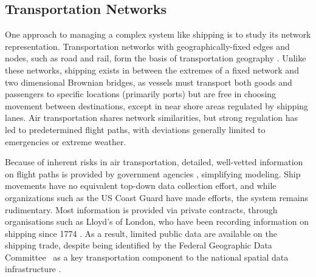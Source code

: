 



\subsection{Transportation Networks}
One approach to managing a complex system like shipping is to study its network representation.  Transportation networks with geographically-fixed edges and nodes, such as road and rail, form the basis of transportation geography \citep{Rodrigue2009}. Unlike these networks, shipping exists in between the extremes of a fixed network %
 and two dimensional Brownian bridges, as vessels must transport both goods and passengers to specific locations (primarily ports) but are free in choosing movement between destinations, except in near shore areas regulated by shipping lanes. Air transportation shares network similarities, but strong regulation has led to predetermined flight paths, with deviations generally limited to emergencies or extreme weather. %

Because of inherent risks in air transportation, detailed, well-vetted information on flight paths is provided by government agencies \citep{guimera2005worldwide}, simplifying modeling. Ship movements have no equivalent top-down data collection effort, and while organizations such as the US Coast Guard have made efforts, the system remains rudimentary. Most information is provided via private contracts, through organisations such as Lloyd's of London, who have been recording information on shipping since 1774 \citep{Lloyd'sRegister-FairplayLtd.2010}. As a result, limited public data are available on the shipping trade, despite being identified by the Federal Geographic Data Committee~\citep{FGDC} as a key transportation component to the national spatial data infrastructure \citep{CurrierInPress}.

